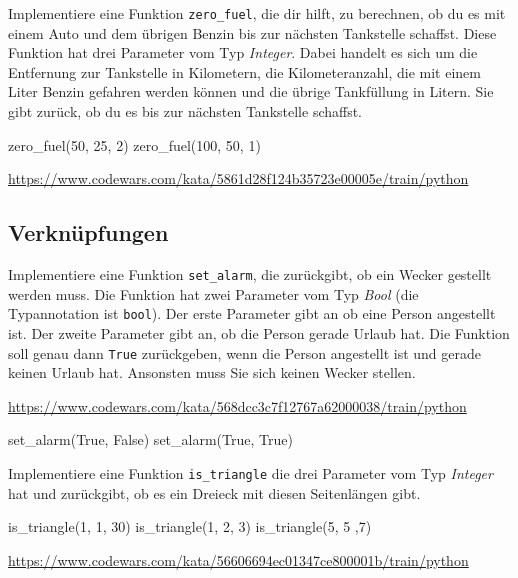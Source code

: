 \documentclass[class=scrartcl, crop=false]{standalone}
\begin{document}
\begin{aufgabe} \noindent
Implementiere eine Funktion \texttt{zero_fuel}, die dir hilft, zu berechnen, ob du es mit einem Auto und dem übrigen Benzin bis zur nächsten Tankstelle schaffst. Diese Funktion hat drei Parameter vom Typ \emph{Integer}. Dabei handelt es sich um die Entfernung zur Tankstelle in Kilometern, die Kilometeranzahl, die mit einem Liter Benzin gefahren werden können und die übrige Tankfüllung in Litern. Sie gibt zurück, ob du es bis zur nächsten Tankstelle schaffst.
	
\begin{pyconsole}
zero_fuel(50, 25, 2)
zero_fuel(100, 50, 1)
\end{pyconsole}
	
\noindent\url{https://www.codewars.com/kata/5861d28f124b35723e00005e/train/python}
\end{aufgabe}

\subsection{Verknüpfungen}
\begin{aufgabe} \noindent
Implementiere eine Funktion \texttt{set_alarm}, die zurückgibt, ob ein Wecker gestellt werden muss. Die Funktion hat zwei Parameter vom Typ \emph{Bool} (die Typannotation ist \texttt{bool}). Der erste Parameter gibt an ob eine Person angestellt ist. Der zweite Parameter gibt an, ob die Person gerade Urlaub hat. Die Funktion soll genau dann \texttt{True} zurückgeben, wenn die Person angestellt ist und gerade keinen Urlaub hat. Ansonsten muss Sie sich keinen Wecker stellen. 


\noindent\url{https://www.codewars.com/kata/568dcc3c7f12767a62000038/train/python}\\
\end{aufgabe}

\begin{pyconsole}
set_alarm(True, False)
set_alarm(True, True)
\end{pyconsole}

\begin{aufgabe} \noindent
Implementiere eine Funktion \texttt{is_triangle} die  drei Parameter vom Typ \emph{Integer} hat und zurückgibt, ob es ein Dreieck mit diesen Seitenlängen gibt.\\ 
	
\begin{pyconsole}
is_triangle(1, 1, 30)
is_triangle(1, 2, 3)
is_triangle(5, 5 ,7)
\end{pyconsole}
	
\noindent\url{https://www.codewars.com/kata/56606694ec01347ce800001b/train/python}
\end{aufgabe}
\end{document}
